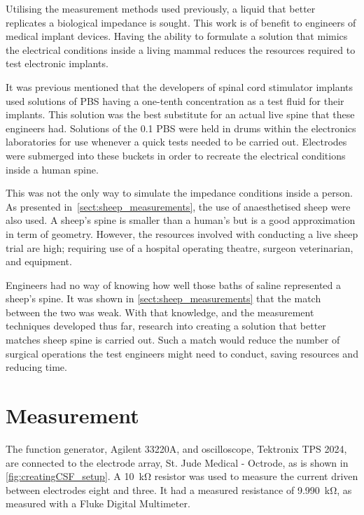 
Utilising the measurement methods used previously, a liquid that better replicates a biological impedance is sought.
This work is of benefit to engineers of medical implant devices.
Having the ability to formulate a solution that mimics the electrical conditions inside a living mammal reduces the resources required to test electronic implants.

It was previous mentioned that the developers of spinal cord stimulator implants used solutions of PBS having a one-tenth concentration as a test fluid for their implants.
This solution was the best substitute for an actual live spine that these engineers had.
Solutions of the \SI{0.1}{\times} PBS were held in drums within the electronics laboratories for use whenever a quick tests needed to be carried out.
Electrodes were submerged into these buckets in order to recreate the electrical conditions inside a human spine.

This was not the only way to simulate the impedance conditions inside a person.
As presented in~\cref{sect:sheep_measurements}, the use of anaesthetised sheep were also used.
A sheep's spine is smaller than a human's but is a good approximation in term of geometry.
However, the resources involved with conducting a live sheep trial are high; requiring use of a hospital operating theatre, surgeon veterinarian, and equipment.

Engineers had no way of knowing how well those baths of saline represented a sheep's spine.
It was shown in \cref{sect:sheep_measurements} that the match between the two was weak.
With that knowledge, and the measurement techniques developed thus far, research into creating a solution that better matches sheep spine is carried out.
Such a match would reduce the number of surgical operations the test engineers might need to conduct, saving resources and reducing time.


\section{Measurement}


  The function generator, Agilent 33220A, and oscilloscope, Tektronix TPS 2024, are connected to the electrode array, St. Jude Medical - Octrode, as is shown in \cref{fig:creatingCSF_setup}.
  A \SI{10}{\kilo\ohm} resistor was used to measure the current driven between electrodes eight and three.
  It had a measured resistance of \SI{9.990}{\kilo\ohm}, as measured with a Fluke Digital Multimeter.

